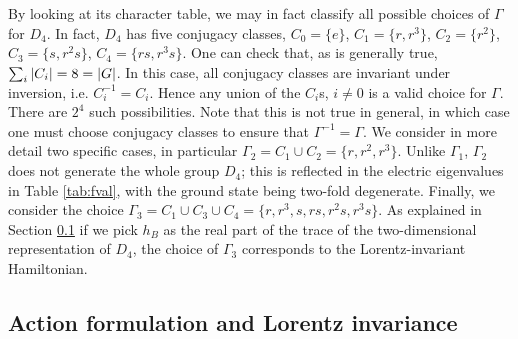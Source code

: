 By looking at its character table, we may in fact classify all possible choices of $\Gamma$ for $D_4$.
In fact, $D_4$ has five conjugacy classes, $C_0 = \{e\}$, $C_1 = \{r, r^3\}$, $C_2 = \{r^2\}$, $C_3 = \{s, r^2s\}$, $C_4 = \{rs, r^3s\}$.
One can check that, as is generally true, $\sum_i \abs{C_i}=8=\abs{G}$.
In this case, all conjugacy classes are invariant under inversion, i.e.
$C_i^{-1}=C_i$.
 Hence any union of the $C_i$s, $i \neq 0$ is a valid choice for $\Gamma$.
There are $2^4$ such possibilities.
Note that this is not true in general, in which case one must choose conjugacy classes to ensure that $\Gamma^{-1}=\Gamma$.
We consider in more detail two specific cases, in particular $\Gamma_2 = C_1 \cup C_2 = \{r, r^2, r^3\}$.
Unlike $\Gamma_1$, $\Gamma_2$ does not generate the whole group $D_4$; this is reflected in the electric eigenvalues in Table \ref{tab:fval}, with the ground state being two-fold degenerate.
Finally, we consider the choice $\Gamma_3=C_1 \cup C_3 \cup C_4=\{r, r^3, s, rs, r^2s, r^3s\}$.
As explained in Section \ref{sec:action formulation} if we pick $h_B$ as the real part of the trace of the two-dimensional representation of $D_4$, the choice of $\Gamma_3$ corresponds to the Lorentz-invariant Hamiltonian.



%
%
\subsection{Action formulation and Lorentz invariance}
\label{sec:action formulation}


